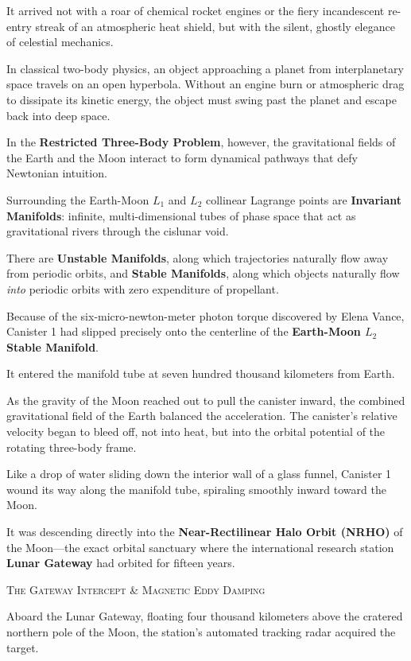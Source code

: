 \documentclass[12pt,twoside,openright]{book}
\newcommand{\sceneheader}[1]{%
  \par\vspace{1.8em}%
  {\noindent\centering\scshape\large #1\par}%
  \vspace{1.0em}%
  \noindent%
}
\newcommand{\dinkus}{%
  \par\vspace{1.2em}%
  {\noindent\centering{\large $\ast\quad\ast\quad\ast$}\par}%
  \vspace{1.2em}%
  \noindent%
}
\begin{document}
It arrived not with a roar of chemical rocket engines or the fiery
incandescent re-entry streak of an atmospheric heat shield, but with the
silent, ghostly elegance of celestial mechanics.

In classical two-body physics, an object approaching a planet from
interplanetary space travels on an open hyperbola. Without an engine
burn or atmospheric drag to dissipate its kinetic energy, the object
must swing past the planet and escape back into deep space.

In the \textbf{Restricted Three-Body Problem}, however, the
gravitational fields of the Earth and the Moon interact to form
dynamical pathways that defy Newtonian intuition.

Surrounding the Earth-Moon \(L_1\) and \(L_2\) collinear Lagrange points
are \textbf{Invariant Manifolds}: infinite, multi-dimensional tubes of
phase space that act as gravitational rivers through the cislunar void.

There are \textbf{Unstable Manifolds}, along which trajectories
naturally flow away from periodic orbits, and \textbf{Stable Manifolds},
along which objects naturally flow \emph{into} periodic orbits with zero
expenditure of propellant.

Because of the six-micro-newton-meter photon torque discovered by Elena
Vance, Canister 1 had slipped precisely onto the centerline of the
\textbf{Earth-Moon \(L_2\) Stable Manifold}.

It entered the manifold tube at seven hundred thousand kilometers from
Earth.

As the gravity of the Moon reached out to pull the canister inward, the
combined gravitational field of the Earth balanced the acceleration. The
canister's relative velocity began to bleed off, not into heat, but into
the orbital potential of the rotating three-body frame.

Like a drop of water sliding down the interior wall of a glass funnel,
Canister 1 wound its way along the manifold tube, spiraling smoothly
inward toward the Moon.

It was descending directly into the \textbf{Near-Rectilinear Halo Orbit
(NRHO)} of the Moon---the exact orbital sanctuary where the
international research station \textbf{Lunar Gateway} had orbited for
fifteen years.

\dinkus

\sceneheader{The Gateway Intercept \& Magnetic Eddy
Damping}

Aboard the Lunar Gateway, floating four thousand kilometers above the
cratered northern pole of the Moon, the station's automated tracking
radar acquired the target.
\end{document}
